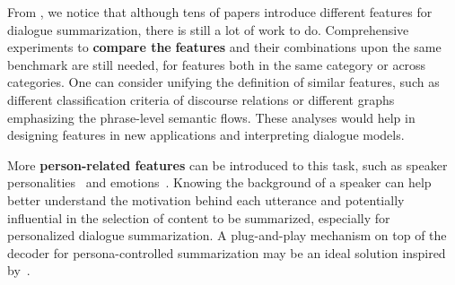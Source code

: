 



From , we notice that although tens of papers 
introduce different features for dialogue summarization, there is still 
a lot of work to do. Comprehensive experiments to \textbf{compare the} \textbf{features} and 
their combinations upon the same benchmark are still needed, 
for features both in the same category or across categories. 
One can consider unifying the definition of similar features, 
such as different classification criteria of discourse relations or different graphs emphasizing the phrase-level semantic flows. 
These analyses would help in designing features in new applications and interpreting dialogue models.


More \textbf{person-related features} can be introduced to this task, 
such as speaker personalities~\cite{zhang2019consistent} and 
emotions~\cite{majumder2019dialoguernn}. Knowing the background of a speaker can help better understand the motivation behind each utterance and potentially influential in the selection of content to be summarized, especially for personalized dialogue summarization.
A plug-and-play mechanism on top of the decoder for persona-controlled summarization may be an ideal solution inspired by~\citet{DathathriMLHFMY20}.
 



